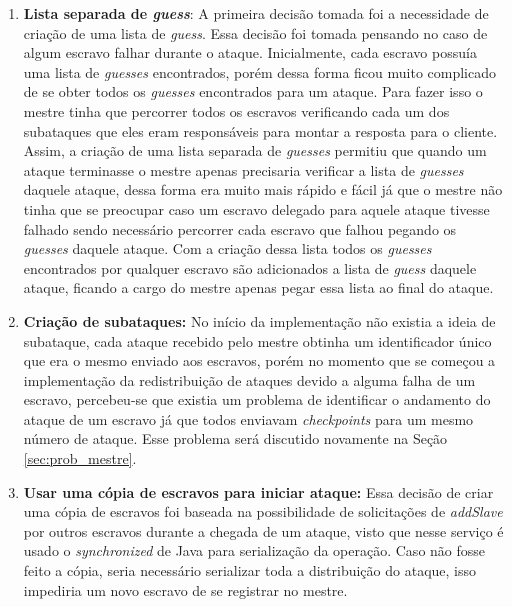 \documentclass[
	12pt,				%
    oneside,			%
	a4paper,			%
	english,			%
	brazil,				%
	]{abntex2}
\begin{document}
\begin{enumerate}

	\item \textbf{Lista separada de \textit{guess}}: A primeira decisão tomada foi a necessidade de criação de uma lista
	de \textit{guess}. Essa decisão foi tomada pensando no caso de algum escravo falhar durante o ataque. Inicialmente, cada
	escravo possuía uma lista de \textit{guesses} encontrados, porém dessa forma ficou muito complicado de se obter todos os 
	\textit{guesses} encontrados para um ataque. Para fazer isso o mestre tinha que percorrer todos os escravos verificando
	cada um dos subataques que eles eram responsáveis para montar a resposta para o cliente. Assim, a criação de uma lista
	separada de \textit{guesses} permitiu que quando um ataque terminasse o mestre apenas precisaria verificar a lista de
	\textit{guesses} daquele ataque, dessa forma era muito mais rápido e fácil já que o mestre não tinha que se preocupar
	caso um escravo delegado para aquele ataque tivesse falhado sendo necessário percorrer cada escravo que falhou pegando os
	\textit{guesses} daquele ataque. Com a criação dessa lista todos os \textit{guesses} encontrados por qualquer escravo
    são adicionados a lista de \textit{guess} daquele ataque, ficando a cargo do mestre apenas pegar essa lista ao final
    do ataque.
	
	\item \textbf{Criação de subataques:} No início da implementação não existia a ideia de subataque, cada ataque recebido
	pelo mestre obtinha um identificador único que era o mesmo enviado aos escravos, porém no momento que se começou a 
	implementação da redistribuição de ataques devido a alguma falha de um escravo, percebeu-se que existia um problema de
	identificar o andamento do ataque de um escravo já que todos enviavam \textit{checkpoints} para um mesmo número 
	de ataque. Esse problema será discutido novamente na Seção \ref{sec:prob_mestre}.
	
	\item \textbf{Usar uma cópia de escravos para iniciar ataque:} Essa decisão de criar uma cópia de escravos foi baseada
	na possibilidade de solicitações de \textit{addSlave} por outros escravos durante a chegada de um ataque,
	visto que nesse serviço é usado o \textit{synchronized} de Java para serialização da operação. Caso não fosse feito 
	a cópia, seria necessário serializar toda a distribuição do ataque, isso impediria um novo escravo de se registrar no
	mestre.


\end{enumerate}
\end{document}
